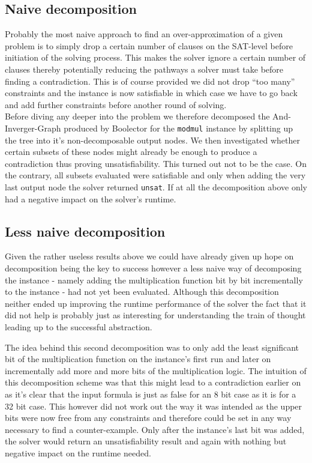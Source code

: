 \subsection{Naive decomposition}
Probably the most naive approach to find an over-approximation of a given problem is to simply drop a certain number of clauses on the SAT-level before initiation of the solving process. This makes the solver ignore a certain number of clauses thereby potentially reducing the pathways a solver must take before finding a contradiction. This is of course provided we did not drop \enquote{too many} constraints and the instance is now satisfiable in which case we have to go back and add further constraints before another round of solving.\\
Before diving any deeper into the problem we therefore decomposed the And-Inverger-Graph \cite{Biere-FMV-TR-11-2-AIGER}  produced by Boolector for the \texttt{modmul} instance by splitting up the tree into it's non-decomposable output nodes. We then investigated whether certain subsets of these nodes might already be enough to produce a contradiction thus proving unsatisfiability. This turned out not to be the case. On the contrary, all subsets evaluated were satisfiable and only when adding the very last output node the solver returned \texttt{unsat}. If at all the decomposition above only had a negative impact on the solver's runtime.

\subsection{Less naive decomposition}

Given the rather useless results above we could have already given up hope on decomposition being the key to success however a less naive way of decomposing the instance - namely adding the multiplication function bit by bit incrementally to the instance - had not yet been evaluated. Although this decomposition neither ended up improving the runtime performance of the solver the fact that it did not help is probably just as interesting for understanding the train of thought leading up to the successful abstraction. 
\par
The idea behind this second decomposition was to only add the least significant bit of the multiplication function on the instance's first run and later on incrementally add more and more bits of the multiplication logic. The intuition of this decomposition scheme was that this might lead to a contradiction earlier on as it's clear that the input formula is just as false for an 8 bit case as it is for a 32 bit case. This however did not work out the way it was intended as the upper bits were now free from any constraints and therefore could be set in any way necessary to find a counter-example. Only after the instance's last bit was added, the solver would return an unsatisfiability result and again with nothing but negative impact on the runtime needed.

